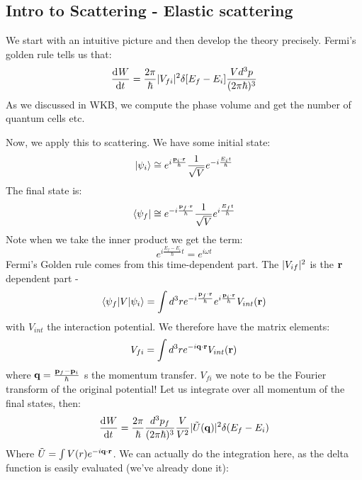 \subsection{Intro to Scattering - Elastic scattering}
We start with an intuitive picture and then develop the theory precisely. Fermi's golden rule tells us that:
\begin{equation}
    \dod{W}{t} = \frac{2\pi}{\hbar}\abs{V_{fi}}^2 \delta[E_f - E_i]\frac{Vd^3p}{(2\pi\hbar)^3}
\end{equation}
As we discussed in WKB, we compute the phase volume and get the number of quantum cells etc.

Now, we apply this to scattering. We have some initial state:
\begin{equation}
    \lvert \psi_i \rangle \cong e^{i\frac{\mathbf{p}_i \cdot \mathbf{r}}{\hbar}}\frac{1}{\sqrt{V}}e^{-i\frac{E_i t}{\hbar}}
\end{equation}
The final state is:
\begin{equation}
    \langle \psi_f \rvert \cong e^{-i\frac{\mathbf{p}_f \cdot \mathbf{r}}{\hbar}}\frac{1}{\sqrt{V}}e^{i\frac{E_f t}{\hbar}}
\end{equation}
Note when we take the inner product we get the term:
\begin{equation}
    e^{i\frac{E_f - E_i}{\hbar}t} = e^{i\omega t}
\end{equation}
Fermi's Golden rule comes from this time-dependent part. The $\lvert V_{if} \rvert^2$ is the $\mathbf{r}$ dependent part - 
\begin{equation}
    \langle \psi_f \rvert V\lvert \psi_i \rangle = \int d^3r e^{-i\frac{\mathbf{p}_f \cdot \mathbf{r}}{\hbar}}e^{i\frac{\mathbf{p}_i \cdot \mathbf{r}}{\hbar}} V_{int}(\mathbf{r})
\end{equation}
with $V_{int}$ the interaction potential. We therefore have the matrix elements:
\begin{equation}
    V_{fi} = \int d^3r e^{-i\mathbf{q} \cdot \mathbf{r}}V_{int}(\mathbf{r})
\end{equation}
where $\mathbf{q} = \frac{\mathbf{p}_f - \mathbf{p}_i}{\hbar}$ s the momentum transfer. $V_{fi}$ we note to be the Fourier transform of the original potential! Let us integrate over all momentum of the final states, then:
\begin{equation}
    \dod{W}{t} = \frac{2\pi}{\hbar}\frac{d^3p_f}{(2\pi\hbar)^3}\frac{V}{V^2}\abs{\tilde{U}(\v{q})}^2\delta(E_f - E_i)
\end{equation}
Where $\tilde{U} = \int V(r)e^{-i\mathbf{q} \cdot \mathbf{r}}$. We can actually do the integration here, as the delta function is easily evaluated (we've already done it):
